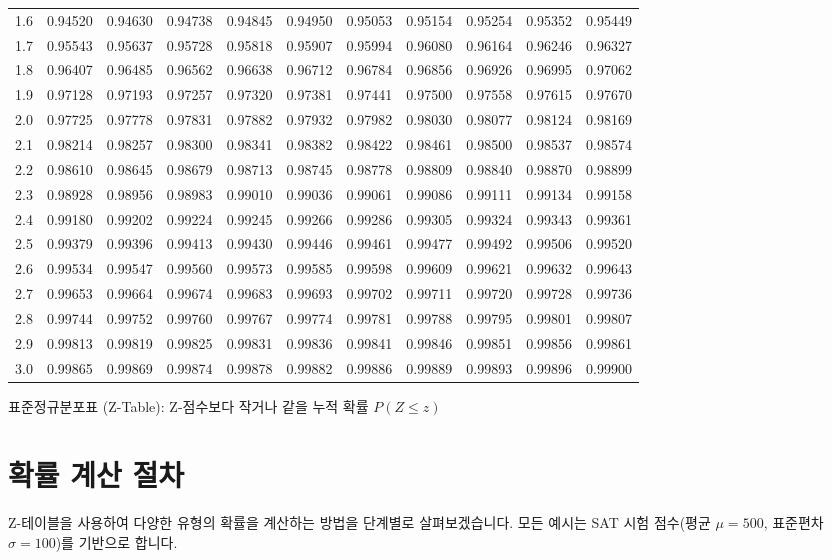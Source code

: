 \documentclass[11pt,a4paper]{article}
\begin{document}
\begin{adjustbox}{width=\textwidth,center}
\begin{tabular}{ccccccccccc}
1.6 & 0.94520 & 0.94630 & 0.94738 & 0.94845 & 0.94950 & 0.95053 & 0.95154 & 0.95254 & 0.95352 & 0.95449 \\
1.7 & 0.95543 & 0.95637 & 0.95728 & 0.95818 & 0.95907 & 0.95994 & 0.96080 & 0.96164 & 0.96246 & 0.96327 \\
1.8 & 0.96407 & 0.96485 & 0.96562 & 0.96638 & 0.96712 & 0.96784 & 0.96856 & 0.96926 & 0.96995 & 0.97062 \\
1.9 & 0.97128 & 0.97193 & 0.97257 & 0.97320 & 0.97381 & 0.97441 & 0.97500 & 0.97558 & 0.97615 & 0.97670 \\
2.0 & 0.97725 & 0.97778 & 0.97831 & 0.97882 & 0.97932 & 0.97982 & 0.98030 & 0.98077 & 0.98124 & 0.98169 \\
2.1 & 0.98214 & 0.98257 & 0.98300 & 0.98341 & 0.98382 & 0.98422 & 0.98461 & 0.98500 & 0.98537 & 0.98574 \\
2.2 & 0.98610 & 0.98645 & 0.98679 & 0.98713 & 0.98745 & 0.98778 & 0.98809 & 0.98840 & 0.98870 & 0.98899 \\
2.3 & 0.98928 & 0.98956 & 0.98983 & 0.99010 & 0.99036 & 0.99061 & 0.99086 & 0.99111 & 0.99134 & 0.99158 \\
2.4 & 0.99180 & 0.99202 & 0.99224 & 0.99245 & 0.99266 & 0.99286 & 0.99305 & 0.99324 & 0.99343 & 0.99361 \\
2.5 & 0.99379 & 0.99396 & 0.99413 & 0.99430 & 0.99446 & 0.99461 & 0.99477 & 0.99492 & 0.99506 & 0.99520 \\
2.6 & 0.99534 & 0.99547 & 0.99560 & 0.99573 & 0.99585 & 0.99598 & 0.99609 & 0.99621 & 0.99632 & 0.99643 \\
2.7 & 0.99653 & 0.99664 & 0.99674 & 0.99683 & 0.99693 & 0.99702 & 0.99711 & 0.99720 & 0.99728 & 0.99736 \\
2.8 & 0.99744 & 0.99752 & 0.99760 & 0.99767 & 0.99774 & 0.99781 & 0.99788 & 0.99795 & 0.99801 & 0.99807 \\
2.9 & 0.99813 & 0.99819 & 0.99825 & 0.99831 & 0.99836 & 0.99841 & 0.99846 & 0.99851 & 0.99856 & 0.99861 \\
3.0 & 0.99865 & 0.99869 & 0.99874 & 0.99878 & 0.99882 & 0.99886 & 0.99889 & 0.99893 & 0.99896 & 0.99900 \\
\bottomrule
\end{tabular}
\caption{표준정규분포표 (Z-Table): Z-점수보다 작거나 같을 누적 확률 $P(Z \le z)$}
\label{tab:z_table}
\end{adjustbox}

\newpage
\section*{확률 계산 절차}
Z-테이블을 사용하여 다양한 유형의 확률을 계산하는 방법을 단계별로 살펴보겠습니다. 모든 예시는 SAT 시험 점수(평균 $\mu=500$, 표준편차 $\sigma=100$)를 기반으로 합니다.
\end{document}
